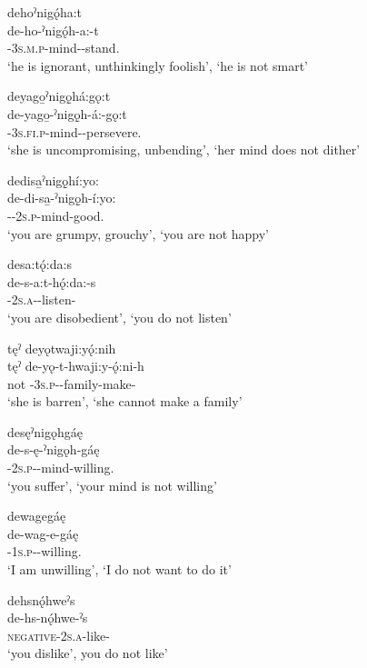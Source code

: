 \ex dehoˀnigǫ́ha:t \\
\gll de-ho-ˀnigǫ́h-a:-t\\
{\negative}-\textsc{3s.m.p}-mind-{\joinerA}-stand.{\stative}\\
\glt ‘he is ignorant, unthinkingly foolish’, `he is not smart'

\ex deyago̱ˀnigǫ̱há:gǫ:t \\
\gll de-yago̱-ˀnigǫ̱h-á:-gǫ:t\\
{\negative}-\textsc{3s.fi.p}-mind-{\joinerA}-persevere.{\stative}\\
\glt ‘she is uncompromising, unbending’, `her mind does not dither'

\ex dedisa̱ˀnigǫ̱hí:yo: \\
\gll de-di-sa̱-ˀnigǫ̱h-í:yo:\\
{\negative}-{\cislocative}-\textsc{2s.p}-mind-good.{\stative}\\
\glt ‘you are grumpy, grouchy’, `you are not happy'

\ex desa:tǫ́:da:s \\
\gll de-s-a:t-hǫ́:da:-s\\
{\negative}-\textsc{2s.a}-{\semireflexive}-listen-{\habitual}\\
\glt ‘you are disobedient’, `you do not listen'

\ex tęˀ deyǫtwaji:yǫ́:nih  \\
\gll tęˀ de-yǫ-t-hwaji:y-ǫ́:ni-h\\
not {\negative}-\textsc{3s.p}-{\semireflexive}-family-make-{\habitual}\\
\glt ‘she is barren’, ‘she cannot make a family’

\ex desęˀnigǫhgáę \\
\gll de-s-ę-ˀnigǫh-gáę\\
{\negative}-\textsc{2s.p}-{\semireflexive}-mind-willing.{\stative}\\
\glt ‘you suffer’, `your mind is not willing'

\ex dewagegáę \\
\gll de-wag-e-gáę\\
{\negative}-\textsc{1s.p}-{\joinerE}-willing.{\stative}\\
\glt ‘I am unwilling’, `I do not want to do it'

\ex dehsnǫ́hweˀs\\
\gll de-hs-nǫ́hwe-ˀs\\
\textsc{negative-2s.a}-like-{\habitual}\\
\glt  ‘you dislike’, you do not like'

